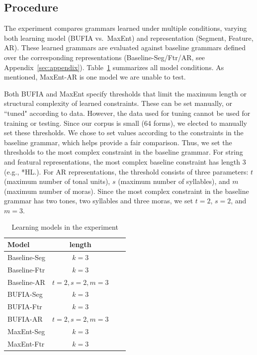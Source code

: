 \documentclass[11pt]{article}
\begin{document}

\subsection{Procedure}

The experiment compares grammars learned under multiple conditions,
varying both learning model (BUFIA vs.\ MaxEnt) and
representation (Segment, Feature, AR).
These learned grammars are evaluated against baseline grammars defined over the
corresponding representations (Baseline-Seg/Ftr/AR, see Appendix~\ref{sec:appendix}).
Table~\ref{tab.all.models} summarizes all model conditions.
As mentioned, MaxEnt-AR is one model we are unable to test.

Both BUFIA and MaxEnt specify thresholds that limit the maximum length
or structural complexity of learned constraints.
These can be set manually, or ``tuned" according to data.
However, the data used for tuning cannot be used for training or testing.
Since our corpus is small (64 forms), we elected to manually set these
thresholds.
We chose to set values according to the constraints in the baseline grammar,
which helps provide a fair comparison. Thus, we set the thresholds to the 
most complex constraint in the baseline grammar.
For string and featural representations,
the most complex baseline constraint has length 3 (e.g., *HL.).
For AR representations, the threshold consists of three parameters:
$t$ (maximum number of tonal units), $s$ (maximum number of syllables), and
$m$ (maximum number of moras).
Since the most complex constraint in the baseline grammar has two tones, two
syllables and three moras,
we set $t=2$, $s=2$, and $m=3$.

\begin{table}[t]
\centering
	\begin{tabular}{lccc}
	\toprule
		Model        & length              \\
	\midrule
		Baseline-Seg & $ k =3 $            \\
		Baseline-Ftr & $ k =3 $            \\
		Baseline-AR  & $t = 2, s = 2, m=3$ \\
	\midrule
		BUFIA-Seg    & $ k =3 $            \\
		BUFIA-Ftr    & $ k =3 $            \\
		BUFIA-AR     & $t = 2,s = 2, m=3$  \\
	\midrule
		MaxEnt-Seg   & $ k =3 $            \\
		MaxEnt-Ftr   & $ k =3 $            \\
	\bottomrule
	\end{tabular}
\caption{Learning models in the experiment}
\label{tab.all.models}
\end{table}
\end{document}
